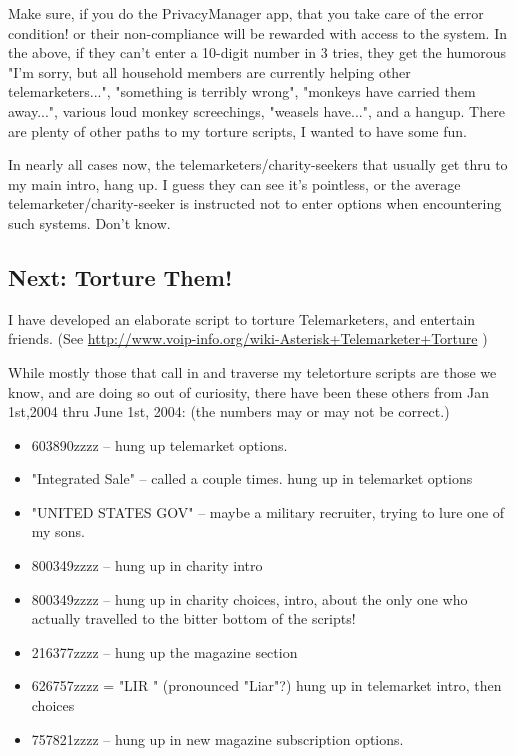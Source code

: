 Make sure, if you do the PrivacyManager app, that you take care of the
error condition! or their non-compliance will be rewarded with access
to the system. In the above, if they can't enter a 10-digit number in
3 tries, they get the humorous "I'm sorry, but all household members
are currently helping other telemarketers...", "something is terribly
wrong", "monkeys have carried them away...", various loud monkey
screechings, "weasels have...", and a hangup. There are plenty of
other paths to my torture scripts, I wanted to have some fun.

In nearly all cases now, the telemarketers/charity-seekers that
usually get thru to my main intro, hang up. I guess they can see it's
pointless, or the average telemarketer/charity-seeker is instructed
not to enter options when encountering such systems. Don't know.


\subsection{Next: Torture Them!}

I have developed an elaborate script to torture Telemarketers, and
entertain friends. (See
\url{http://www.voip-info.org/wiki-Asterisk+Telemarketer+Torture} )

While mostly those that call in and traverse my teletorture scripts
are those we know, and are doing so out of curiosity, there have been
these others from Jan 1st,2004 thru June 1st, 2004:
(the numbers may or may not be correct.)

\begin{itemize}
    \item 603890zzzz -- hung up telemarket options.
    \item "Integrated Sale" -- called a couple times. hung up in telemarket options
    \item "UNITED STATES GOV" -- maybe a military recruiter, trying to lure one of my sons.
    \item 800349zzzz -- hung up in charity intro
    \item 800349zzzz -- hung up in charity choices, intro, about the only one who actually travelled to the bitter bottom of the scripts!
    \item 216377zzzz -- hung up the magazine section
    \item 626757zzzz = "LIR    " (pronounced "Liar"?) hung up in telemarket intro, then choices
    \item 757821zzzz -- hung up in new magazine subscription options.
\end{itemize}

